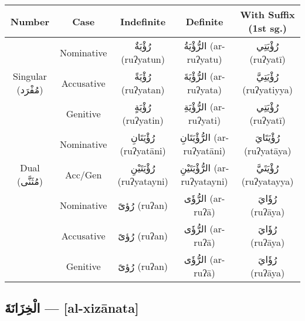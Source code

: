 \documentclass[letter,12pt]{article}
\begin{document}
\begin{tabular}{|c|c|c|c|c|}
\hline
\textbf{Number} & \textbf{Case} & \textbf{Indefinite} & \textbf{Definite} & \textbf{With Suffix (1st sg.)} \\
\hline
\multirow{3}{*}{Singular (\textarabic{مُفْرَد})} 
 & Nominative   & \textarabic{رُؤْيَةٌ} (ruʔyatun) & \textarabic{الرُّؤْيَةُ} (ar-ruʔyatu) & \textarabic{رُؤْيَتِي} (ruʔyatī) \\
 & Accusative   & \textarabic{رُؤْيَةً} (ruʔyatan) & \textarabic{الرُّؤْيَةَ} (ar-ruʔyata) & \textarabic{رُؤْيَتِيَّ} (ruʔyatiyya) \\
 & Genitive     & \textarabic{رُؤْيَةٍ} (ruʔyatin) & \textarabic{الرُّؤْيَةِ} (ar-ruʔyati) & \textarabic{رُؤْيَتِي} (ruʔyatī) \\
\hline
\multirow{3}{*}{Dual (\textarabic{مُثَنَّى})} 
 & Nominative   & \textarabic{رُؤْيَتَانِ} (ruʔyatāni) & \textarabic{الرُّؤْيَتَانِ} (ar-ruʔyatāni) & \textarabic{رُؤْيَتَايَ} (ruʔyatāya) \\
 & Acc/Gen      & \textarabic{رُؤْيَتَيْنِ} (ruʔyatayni) & \textarabic{الرُّؤْيَتَيْنِ} (ar-ruʔyatayni) & \textarabic{رُؤْيَتَيَّ} (ruʔyatayya) \\
\hline
\multirow{3}{*}{Plural (\textarabic{جَمْع})} 
  & Nominative    & \textarabic{رُؤىً} (ruʔan) & \textarabic{الرُّؤَى} (ar-ruʔā) & \textarabic{رُؤَايَ} (ruʔāya) \\
  & Accusative      & \textarabic{رُؤىً} (ruʔan) & \textarabic{الرُّؤَى} (ar-ruʔā) & \textarabic{رُؤَايَ} (ruʔāya) \\
  & Genitive          & \textarabic{رُؤىً} (ruʔan) & \textarabic{الرُّؤَى} (ar-ruʔā) & \textarabic{رُؤَايَ} (ruʔāya) \\
\hline
\end{tabular}

\subsection{\textarabic{الْخِزَانَةَ} — [al-xizānata]}
\end{document}
